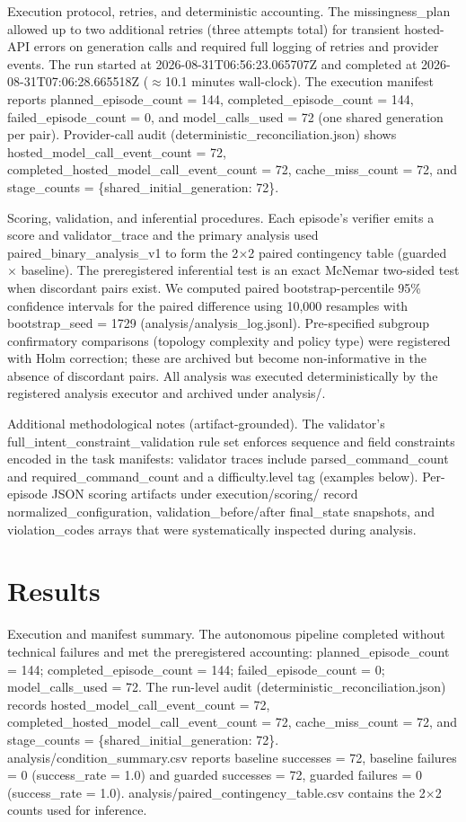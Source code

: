\documentclass[conference]{IEEEtran}
\begin{document}
Execution protocol, retries, and deterministic accounting. The missingness\_plan allowed up to two additional retries (three attempts total) for transient hosted-API errors on generation calls and required full logging of retries and provider events. The run started at 2026-08-31T06:56:23.065707Z and completed at 2026-08-31T07:06:28.665518Z (\ensuremath{\approx}10.1 minutes wall-clock). The execution manifest reports planned\_episode\_count = 144, completed\_episode\_count = 144, failed\_episode\_count = 0, and model\_calls\_used = 72 (one shared generation per pair). Provider-call audit (deterministic\_reconciliation.json) shows hosted\_model\_call\_event\_count = 72, completed\_hosted\_model\_call\_event\_count = 72, cache\_miss\_count = 72, and stage\_counts = \{shared\_initial\_generation: 72\}.

Scoring, validation, and inferential procedures. Each episode's verifier emits a score and validator\_trace and the primary analysis used paired\_binary\_analysis\_v1 to form the 2\ensuremath{\times}2 paired contingency table (guarded \ensuremath{\times} baseline). The preregistered inferential test is an exact McNemar two-sided test when discordant pairs exist. We computed paired bootstrap-percentile 95\% confidence intervals for the paired difference using 10,000 resamples with bootstrap\_seed = 1729 (analysis/analysis\_log.jsonl). Pre-specified subgroup confirmatory comparisons (topology complexity and policy type) were registered with Holm correction; these are archived but become non-informative in the absence of discordant pairs. All analysis was executed deterministically by the registered analysis executor and archived under analysis/.

Additional methodological notes (artifact-grounded). The validator's full\_intent\_constraint\_validation rule set enforces sequence and field constraints encoded in the task manifests: validator traces include parsed\_command\_count and required\_command\_count and a difficulty.level tag (examples below). Per-episode JSON scoring artifacts under execution/scoring/ record normalized\_configuration, validation\_before/after final\_state snapshots, and violation\_codes arrays that were systematically inspected during analysis.

\section{Results}
Execution and manifest summary. The autonomous pipeline completed without technical failures and met the preregistered accounting: planned\_episode\_count = 144; completed\_episode\_count = 144; failed\_episode\_count = 0; model\_calls\_used = 72. The run-level audit (deterministic\_reconciliation.json) records hosted\_model\_call\_event\_count = 72, completed\_hosted\_model\_call\_event\_count = 72, cache\_miss\_count = 72, and stage\_counts = \{shared\_initial\_generation: 72\}. analysis/condition\_summary.csv reports baseline successes = 72, baseline failures = 0 (success\_rate = 1.0) and guarded successes = 72, guarded failures = 0 (success\_rate = 1.0). analysis/paired\_contingency\_table.csv contains the 2\ensuremath{\times}2 counts used for inference.
\end{document}
